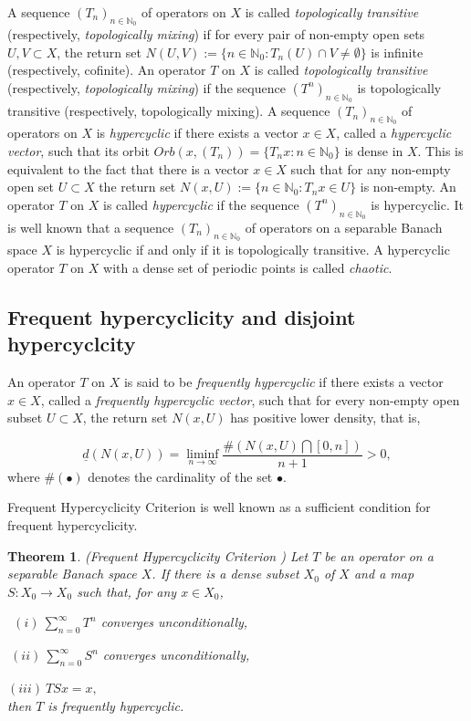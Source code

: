 \documentclass{article}
\newtheorem{theorem}{Theorem}[section]
\begin{document}
A sequence $(T_{n})_{n\in\mathbb{N}_{0}}$ of operators on $X$ is called \textit{topologically transitive} (respectively, \textit{topologically mixing}) if for every pair of non-empty open sets $U, V\subset X$, the return set $N(U,V):=\{n\in\mathbb{N}_{0}: T_{n}(U)\cap V\neq \emptyset\}$ is infinite (respectively, cofinite). An operator $T$ on $X$ is called \textit{topologically transitive} (respectively, \textit{topologically mixing}) if the sequence $(T^{n})_{n\in\mathbb{N}_{0}}$ is topologically transitive (respectively, topologically mixing).
A sequence $(T_{n})_{n\in\mathbb{N}_{0}}$ of operators on $X$ is \textit{hypercyclic} if there exists a vector $x \in X$, called a \textit{hypercyclic vector}, such that its orbit $ Orb(x, (T_{n})) =\{T_{n}x:n\in {\mathbb{N}_{0}} \}$ is dense in $X$. This is equivalent to the fact that there is a vector $x \in X$ such that for any non-empty open set $U \subset X$ the return set $N(x,U) := \{n \in {\mathbb{N}_{0}}:T_{n}x \in U \}$ is non-empty. An operator $T$ on $X$ is called \textit{hypercyclic} if the sequence $(T^{n})_{n\in\mathbb{N}_{0}}$ is hypercyclic. It is well known that a sequence $(T_{n})_{n\in\mathbb{N}_{0}}$ of operators on a separable Banach space $X$ is hypercyclic if and only if it is topologically transitive. A hypercyclic operator $T$ on $X$ with a dense set of periodic points  is called \textit{chaotic}.


\subsection{Frequent hypercyclicity and disjoint hypercyclcity}

An operator $T$ on $X$ is said to be \textit{frequently hypercyclic} if there exists
a vector $x\in X$, called a \textit{frequently hypercyclic vector}, such that for every non-empty open subset $U \subset X$, the return set $N(x,U)$ has positive lower density, that is,

 \[\underline{d} (N(x,U))=\liminf_{n \rightarrow \infty}\frac{\# (N(x,U)\bigcap [0,n])}{n+1} >0, \]
 where $\# (\bullet)$ denotes the cardinality of the set $\bullet$.

Frequent Hypercyclicity Criterion is well known as a sufficient condition for frequent hypercyclicity.

\begin{theorem} \textnormal{(Frequent Hypercyclicity Criterion \cite{GM11})} Let $T$ be an operator on a separable Banach space $X$. If there is a dense subset $X_{0}$ of $X$ and a map $S:X_{0}\rightarrow X_{0}$ such that, for any $x\in X_{0}$,


$~~(i)~\sum^{\infty}_{n=0}T^{n}$ converges unconditionally,
	
$~(ii)~\sum^{\infty}_{n=0}S^{n}$ converges unconditionally,
	
$(iii)~TSx=x,$\\
then $T$ is frequently hypercyclic.
\end{theorem}
\end{document}
